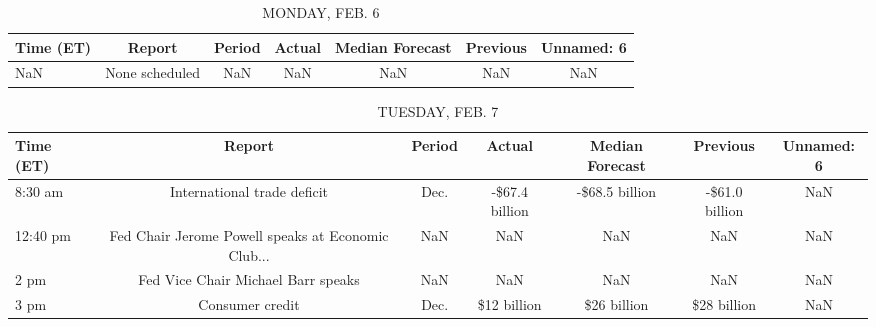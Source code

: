 \documentclass{article}%
\begin{document}
%
\normalsize%


\begin{table}[htbp]%
\caption{MONDAY, FEB. 6}%
\centering%
\begin{adjustbox}{width=1\textwidth}%
\begin{tabular}{lcccccc}
\toprule
Time (ET) &         Report & Period & Actual & Median Forecast & Previous & Unnamed: 6 \\
\midrule
      NaN & None scheduled &    NaN &    NaN &             NaN &      NaN &        NaN \\
\bottomrule
\end{tabular}
%
\end{adjustbox}%
\end{table}

%


\begin{table}[htbp]%
\caption{TUESDAY, FEB. 7}%
\centering%
\begin{adjustbox}{width=1\textwidth}%
\begin{tabular}{lcccccc}
\toprule
Time (ET) &                                             Report & Period &         Actual & Median Forecast &       Previous & Unnamed: 6 \\
\midrule
  8:30 am &                        International trade deficit &   Dec. & -\$67.4 billion &  -\$68.5 billion & -\$61.0 billion &        NaN \\
 12:40 pm & Fed Chair Jerome Powell speaks at Economic Club... &    NaN &            NaN &             NaN &            NaN &        NaN \\
     2 pm &                 Fed Vice Chair Michael Barr speaks &    NaN &            NaN &             NaN &            NaN &        NaN \\
     3 pm &                                    Consumer credit &   Dec. &    \$12 billion &     \$26 billion &    \$28 billion &        NaN \\
\bottomrule
\end{tabular}
%
\end{adjustbox}%
\end{table}

%
\end{document}
